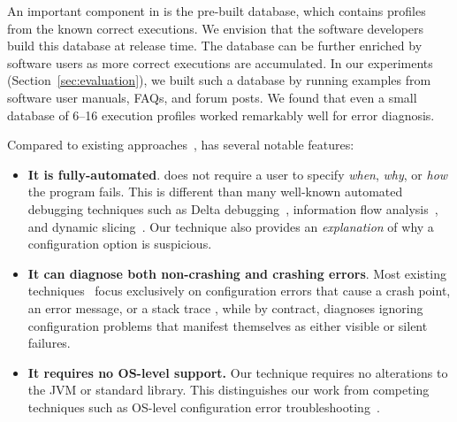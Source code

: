 

An important component in \ourtool is the pre-built
database, which contains profiles
from the known correct executions. We envision that 
the software developers build this database at release time.
The database can be
further enriched by software users as more correct
executions are accumulated. 
In our experiments (Section~\ref{sec:evaluation}), we
built such a database by running examples from software
user manuals, FAQs, and forum posts.  We
found that even a small database of 6--16 execution profiles worked remarkably
well for error diagnosis.

Compared to existing approaches~\cite{Zeller:2002:ICC, Zhang:2003:PDS,
Rabkin:2011:PPC, Whitaker:2004:CDS, Attariyan:2010:ACT, Wang:2004:AMT}, \ourtool has
several notable features:

\begin{itemize}
\item \textbf{It is fully-automated}.
\ourtool does not require a user to specify
\textit{when}, \textit{why}, or \textit{how} the program fails. This is
different than many well-known automated debugging techniques such
as Delta debugging~\cite{Zeller:2002:ICC}, information flow analysis~\cite{Attariyan:2010:ACT},
 and dynamic slicing~\cite{Zhang:2003:PDS}.
Our technique also provides an \emph{explanation} of
why a configuration option is suspicious. 

\item \textbf{It can diagnose both non-crashing and crashing errors}.
Most existing techniques~\cite{Rabkin:2011:PPC,
Whitaker:2004:CDS, Attariyan:2010:ACT, Su:2007:AIC} focus exclusively on configuration errors
that cause a crash point, an error message, or a stack trace
, while by contract, \ourtool diagnoses
ignoring configuration problems that manifest themselves as
either visible or silent failures.

\item \textbf{It requires no OS-level support.} Our technique requires no alterations to
the JVM or standard library. This distinguishes our work from
competing techniques such as OS-level configuration
error troubleshooting~\cite{Whitaker:2004:CDS, Su:2007:AIC}.%

\end{itemize}

